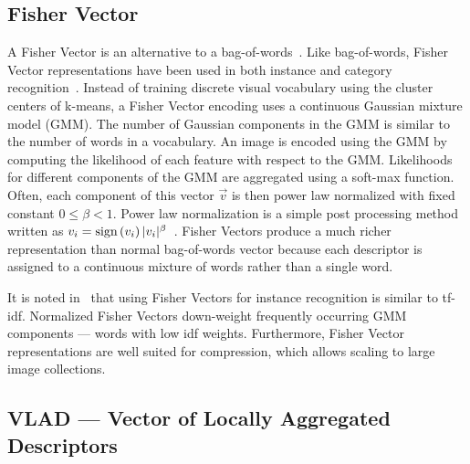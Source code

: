     \subsection{Fisher Vector}
        A Fisher Vector is an alternative to a bag-of-words~\cite{perronnin_large_scale_2010_1,
        jegou_aggregating_2010}. Like bag-of-words, Fisher Vector representations have been used in both instance
        and category recognition~\cite{perronnin_fisher_2007, cinbis_image_2012, sun_large_scale_2013,
        sanchez_image_2013, juneja_blocks_2013, douze_combining_2011, ma_local_2012, murray_generalized_2014,
        gosselin_revisiting_2014}. Instead of training discrete visual vocabulary using the cluster centers of
        k-means, a Fisher Vector encoding uses a continuous Gaussian mixture model (GMM). The number of Gaussian
        components in the GMM is  similar to the number of words in a vocabulary. An image is encoded using the GMM
        by computing the likelihood of each feature with respect to the GMM{}. Likelihoods for different components
        of the GMM are aggregated using a soft-max function. Often, each component of this vector $\vec{v}$ is then
        power law normalized with fixed constant $0 \leq \beta < 1$. Power law normalization is a simple post
        processing method written as $v_i = \textrm{sign}\left(v_i\right)|v_i|^\beta$~\cite{jegou_aggregating_2012}.
        Fisher Vectors produce a much richer representation than normal bag-of-words vector because each descriptor
        is assigned to a continuous mixture of words rather than a single word.

        It is noted in~\cite{perronnin_large_scale_2010_1} that using Fisher Vectors for instance recognition is
        similar to tf-idf. Normalized Fisher Vectors down-weight frequently occurring GMM components --- \ie{}
        words with low idf weights. Furthermore, Fisher Vector representations are well suited for compression,
        which allows scaling to large image collections.

    \subsection{VLAD --- Vector of Locally Aggregated Descriptors} 

